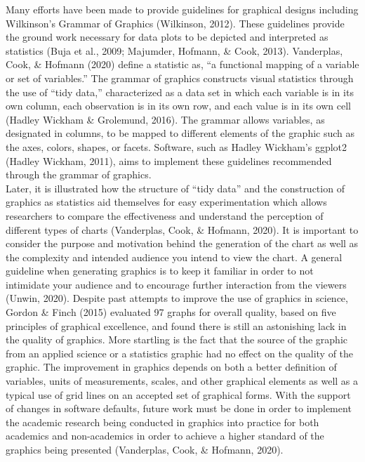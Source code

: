\documentclass[print]{nuthesis}
\begin{document}
Many efforts have been made to provide guidelines for graphical designs including Wilkinson's Grammar of Graphics (Wilkinson, 2012).
These guidelines provide the ground work necessary for data plots to be depicted and interpreted as statistics (Buja et al., 2009; Majumder, Hofmann, \& Cook, 2013).
Vanderplas, Cook, \& Hofmann (2020) define a statistic as, ``a functional mapping of a variable or set of variables.''
The grammar of graphics constructs visual statistics through the use of ``tidy data,'' characterized as a data set in which each variable is in its own column, each observation is in its own row, and each value is in its own cell (Hadley Wickham \& Grolemund, 2016).
The grammar allows variables, as designated in columns, to be mapped to different elements of the graphic such as the axes, colors, shapes, or facets.
Software, such as Hadley Wickham's ggplot2 (Hadley Wickham, 2011), aims to implement these guidelines recommended through the grammar of graphics.\\
Later, it is illustrated how the structure of ``tidy data'' and the construction of graphics as statistics aid themselves for easy experimentation which allows researchers to compare the effectiveness and understand the perception of different types of charts (Vanderplas, Cook, \& Hofmann, 2020).
It is important to consider the purpose and motivation behind the generation of the chart as well as the complexity and intended audience you intend to view the chart.
A general guideline when generating graphics is to keep it familiar in order to not intimidate your audience and to encourage further interaction from the viewers (Unwin, 2020).
Despite past attempts to improve the use of graphics in science, Gordon \& Finch (2015) evaluated 97 graphs for overall quality, based on five principles of graphical excellence, and found there is still an astonishing lack in the quality of graphics.
More startling is the fact that the source of the graphic from an applied science or a statistics graphic had no effect on the quality of the graphic.
The improvement in graphics depends on both a better definition of variables, units of measurements, scales, and other graphical elements as well as a typical use of grid lines on an accepted set of graphical forms.
With the support of changes in software defaults, future work must be done in order to implement the academic research being conducted in graphics into practice for both academics and non-academics in order to achieve a higher standard of the graphics being presented (Vanderplas, Cook, \& Hofmann, 2020).
\end{document}
